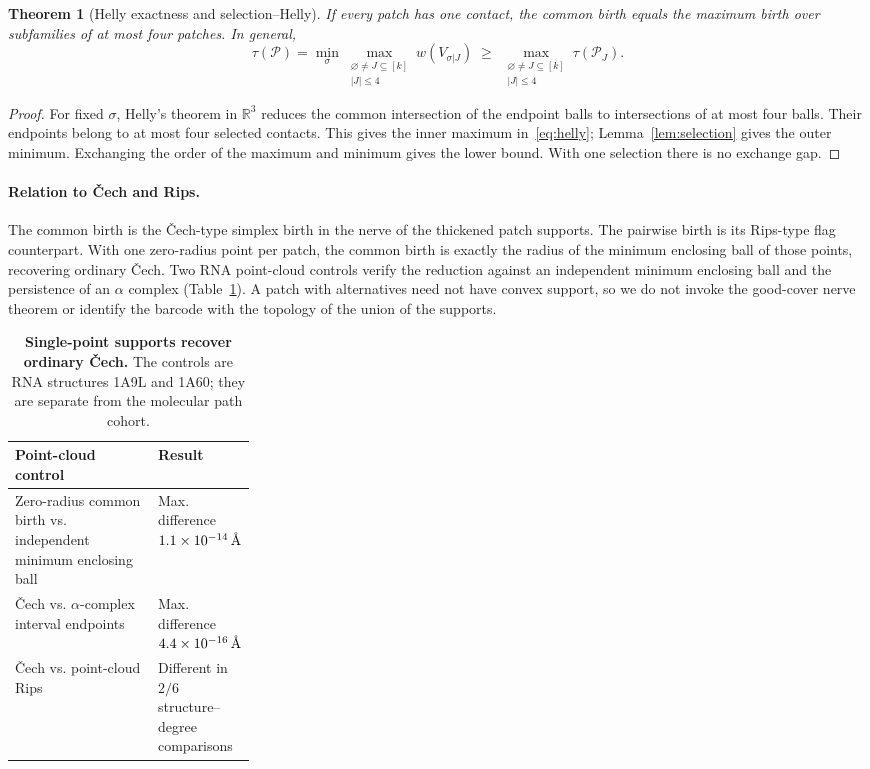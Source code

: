 \documentclass[11pt]{article}
\newcommand{\angstrom}{\ensuremath{\text{\normalfont\AA}}}
\newtheorem{theorem}{Theorem}
\begin{document}
\begin{theorem}[Helly exactness and selection--Helly]
\label{thm:helly}
If every patch has one contact, the common birth equals the maximum birth over subfamilies of at most four patches. In general,
\begin{equation}
 \tau(\mathcal P)
   =\min_\sigma\max_{\substack{\varnothing\ne J\subseteq[k]\\ |J|\leq4}}w(V_{\sigma|J})
   \;\geq\;
     \max_{\substack{\varnothing\ne J\subseteq[k]\\ |J|\leq4}}\tau(\mathcal P_J).
 \label{eq:helly}
\end{equation}
\end{theorem}
\begin{proof}
For fixed $\sigma$, Helly's theorem in $\mathbb R^3$ reduces the common intersection of the endpoint balls to intersections of at most four balls\citep{helly1923}. Their endpoints belong to at most four selected contacts. This gives the inner maximum in~\eqref{eq:helly}; Lemma~\ref{lem:selection} gives the outer minimum. Exchanging the order of the maximum and minimum gives the lower bound. With one selection there is no exchange gap.
\end{proof}

\paragraph{Relation to Čech and Rips.}
The common birth is the Čech-type simplex birth in the nerve of the thickened patch supports. The pairwise birth is its Rips-type flag counterpart. With one zero-radius point per patch, the common birth is exactly the radius of the minimum enclosing ball of those points, recovering ordinary Čech. Two RNA point-cloud controls verify the reduction against an independent minimum enclosing ball and the persistence of an $\alpha$ complex (Table~\ref{tab:cech}). A patch with alternatives need not have convex support, so we do not invoke the good-cover nerve theorem or identify the barcode with the topology of the union of the supports.

\begin{table}[htbp]
\centering
\caption{\textbf{Single-point supports recover ordinary Čech.} The controls are RNA structures 1A9L and 1A60; they are separate from the molecular path cohort.}
\label{tab:cech}
\begin{tabular}{@{}l>{\raggedright\arraybackslash}p{0.28\linewidth}@{}}
\toprule
Point-cloud control & Result \\
\midrule
Zero-radius common birth vs. independent minimum enclosing ball & Max. difference $1.1\times10^{-14}\,\angstrom$ \\
Čech vs. $\alpha$-complex interval endpoints & Max. difference $4.4\times10^{-16}\,\angstrom$ \\
Čech vs. point-cloud Rips & Different in $2/6$ structure--degree comparisons \\
\bottomrule
\end{tabular}
\end{table}
\end{document}
